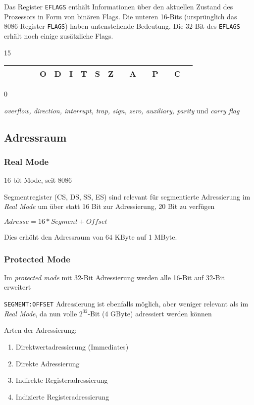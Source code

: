 Das Register {\tt EFLAGS} enthält Informationen über den aktuellen Zustand des Prozessors in Form von binären Flags. Die unteren 16-Bits (ursprünglich das 8086-Register {\tt FLAGS}) haben untenstehende Bedeutung. Die 32-Bit des {\tt EFLAGS} erhält noch einige zusätzliche Flags.

{\small 15}
\begin{tabular}{|c|c|c|c|c|c|c|c|c|c|c|c|c|c|c|c|c|}
\hline & & & & O & D & I & T & S & Z & & A & & P & & C \\
\hline
\end{tabular}
{\small 0}

\emph{overflow, direction, interrupt, trap, sign, zero, auxiliary, parity}
und \emph{carry flag} 

\subsection{Adressraum}

\subsubsection{Real Mode}

16 bit Mode, seit 8086

Segmentregister (CS, DS, SS, ES) sind relevant für segmentierte Adressierung im
\emph{Real Mode} um über statt 16 Bit zur Adressierung, 20 Bit zu verfügen

$Adresse = 16 * Segment + Offset$

Dies erhöht den Adressraum von 64 KByte auf 1 MByte.


\subsubsection{Protected Mode}
Im \emph{protected mode} mit 32-Bit Adressierung werden alle 16-Bit auf 32-Bit erweitert

\texttt{SEGMENT:OFFSET} Adressierung ist ebenfalls möglich, aber weniger relevant als im
\emph{Real Mode}, da nun volle $2^{32}$-Bit (4 GByte) adressiert werden können




Arten der Adressierung:

\begin{enumerate}
\item Direktwertadressierung (Immediates)
\item Direkte Adressierung
\item Indirekte Registeradressierung
\item Indizierte Registeradressierung
\end{enumerate}



